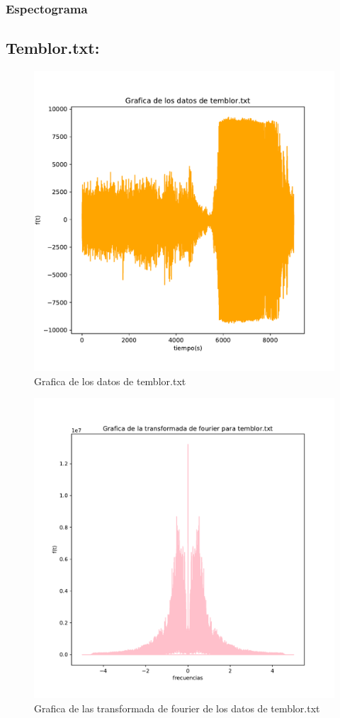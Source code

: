 \documentclass[11pt,letterpaper]{exam}
\begin{document}
\subsubsection{Espectograma}
\subsection{Temblor.txt:}
\begin{figure}[H]
    \centering
    \includegraphics[width=1.1\textwidth]{Temblor.pdf}
    \caption{Grafica de los datos de temblor.txt}
    \label{fig:my_label}
\end{figure}
\begin{figure}[H]
    \centering
    \includegraphics[width=1.1\textwidth]{Fourier_temblor.pdf}
    \caption{Grafica de las transformada de fourier de los datos de temblor.txt}
    \label{fig:my_label}
\end{figure}
\end{document}
